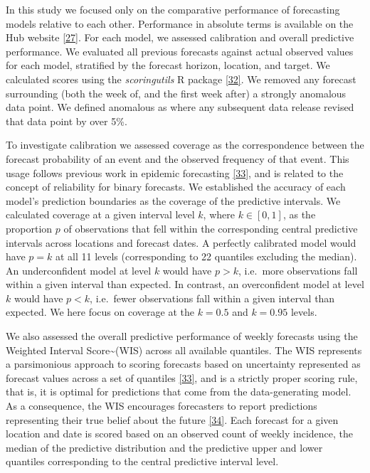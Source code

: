 \documentclass[
]{article}
\begin{document}
In this study we focused only on the comparative performance of forecasting models relative to each other. Performance in absolute terms is available on the Hub website \protect\hyperlink{ref-europeancovid-19forecasthubEuropeanCovid19Forecast}{{[}27{]}}. For each model, we assessed calibration and overall predictive performance. We evaluated all previous forecasts against actual observed values for each model, stratified by the forecast horizon, location, and target. We calculated scores using the \emph{scoringutils} R package \protect\hyperlink{ref-nikosibosseScoringutilsUtilitiesScoring2020}{{[}32{]}}. We removed any forecast surrounding (both the week of, and the first week after) a strongly anomalous data point. We defined anomalous as where any subsequent data release revised that data point by over 5\%.

To investigate calibration we assessed coverage as the correspondence between the forecast probability of an event and the observed frequency of that event. This usage follows previous work in epidemic forecasting \protect\hyperlink{ref-bracherEvaluatingEpidemicForecasts2021}{{[}33{]}}, and is related to the concept of reliability for binary forecasts. We established the accuracy of each model's prediction boundaries as the coverage of the predictive intervals. We calculated coverage at a given interval level \(k\), where \(k\in[0,1]\), as the proportion \(p\) of observations that fell within the corresponding central predictive intervals across locations and forecast dates. A perfectly calibrated model would have \(p=k\) at all 11 levels (corresponding to 22 quantiles excluding the median). An underconfident model at level \(k\) would have \(p>k\), i.e.~more observations fall within a given interval than expected. In contrast, an overconfident model at level \(k\) would have \(p<k\), i.e.~fewer observations fall within a given interval than expected. We here focus on coverage at the \(k=0.5\) and \(k=0.95\) levels.

We also assessed the overall predictive performance of weekly forecasts using the Weighted Interval Score\textasciitilde(WIS) across all available quantiles. The WIS represents a parsimonious approach to scoring forecasts based on uncertainty represented as forecast values across a set of quantiles \protect\hyperlink{ref-bracherEvaluatingEpidemicForecasts2021}{{[}33{]}}, and is a strictly proper scoring rule, that is, it is optimal for predictions that come from the data-generating model. As a consequence, the WIS encourages forecasters to report predictions representing their true belief about the future \protect\hyperlink{ref-gneitingStrictlyProperScoring2007}{{[}34{]}}. Each forecast for a given location and date is scored based on an observed count of weekly incidence, the median of the predictive distribution and the predictive upper and lower quantiles corresponding to the central predictive interval level.
\end{document}
